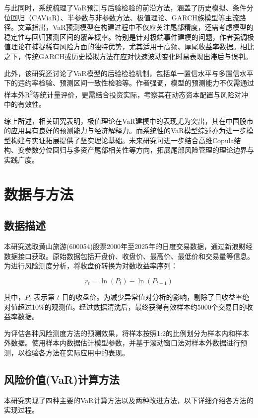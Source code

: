 \documentclass[12pt, a4paper]{article}
\begin{document}
与此同时，\citet{nieto2016frontiers}系统梳理了VaR预测与后验检验的前沿方法，涵盖了历史模拟、条件分位回归（CAViaR）、半参数与非参数方法、极值理论、GARCH族模型等主流路径。文章指出，VaR预测模型在构建过程中不仅应关注尾部精度，还需考虑模型的稳定性与回归预测区间的覆盖概率。特别是针对极端事件建模的问题，作者强调极值理论在捕捉稀有风险方面的独特优势，尤其适用于高频、厚尾收益率数据。相比之下，传统GARCH或历史模拟方法在应对快速波动变化时易表现出滞后与误判。

此外，该研究还讨论了VaR模型的后验检验机制，包括单一置信水平与多置信水平下的违约率检验、预测区间一致性检验等。作者强调，模型的预测能力不仅需通过样本外R\textsuperscript{2}等统计量评价，更需结合投资实际，考察其在动态资本配置与风险对冲中的有效性。

综上所述，相关研究表明，极值理论在VaR建模中的表现尤为突出，其在中国股市的应用具有良好的预测能力与经济解释力。而系统性的VaR模型综述亦为进一步模型构建与实证拓展提供了坚实理论基础。未来研究可进一步结合高维Copula结构、变参数分位回归与多资产尾部相关性等方向，拓展尾部风险管理的理论边界与实践广度。

\section{数据与方法}

\subsection{数据描述}
本研究选取黄山旅游(600054)股票2000年至2025年的日度交易数据，通过新浪财经数据接口获取。原始数据包括开盘价、收盘价、最高价、最低价和交易量等信息。为进行风险测度分析，将收盘价转换为对数收益率序列：

\begin{equation}
r_t = \ln(P_t) - \ln(P_{t-1})
\end{equation}

其中，$P_t$ 表示第 $t$ 日的收盘价。为减少异常值对分析的影响，剔除了日收益率绝对值超过10\%的观测值。经过数据清洗后，最终获得有效样本约5000个交易日的收益率数据。

为评估各种风险测度方法的预测效果，将样本按照1:2的比例划分为样本内和样本外数据。使用样本内数据估计模型参数，并基于滚动窗口法对样本外数据进行预测，以检验各方法在实际应用中的表现。

\subsection{风险价值(VaR)计算方法}
本研究实现了四种主要的VaR计算方法以及两种改进方法，以下详细介绍各方法的实现过程。
\end{document}
